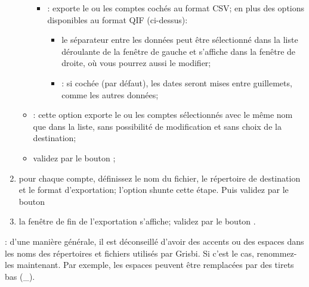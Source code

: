\begin{enumerate}
\begin{itemize}
\begin{itemize}
\begin{itemize}
						\end{itemize}
					\item {}: exporte le ou les comptes cochés au format \gls{CSV}; en plus des options disponibles au format QIF (ci-dessus):
						\begin{itemize}
							\item le séparateur entre les données peut être sélectionné dans la liste déroulante de la fenêtre de gauche et s'affiche dans la fenêtre de droite, où vous pourrez aussi le modifier;
							\item {}: si cochée (par défaut), les dates seront mises entre guillemets, comme les autres données;
						\end{itemize}
			\end{itemize}
			\item {}: cette option exporte le ou les comptes sélectionnés avec le même nom que dans la liste, sans possibilité de modification et sans choix de la destination;
			\item validez par le bouton ;
		\end{itemize}
	\item pour chaque compte, définissez le nom du fichier, le répertoire de destination et le format d'exportation; l'option  shunte cette étape. Puis validez par le bouton 
	\item la fenêtre de fin de l'exportation s'affiche; validez par le bouton .
\end{enumerate}

\Attention{}: d'une manière générale, il est déconseillé d'avoir des accents ou des espaces dans les noms des répertoires et fichiers utilisés par Grisbi. Si c'est le cas, renommez-les maintenant. Par exemple, les espaces peuvent être remplacées par des tirets bas (\_).